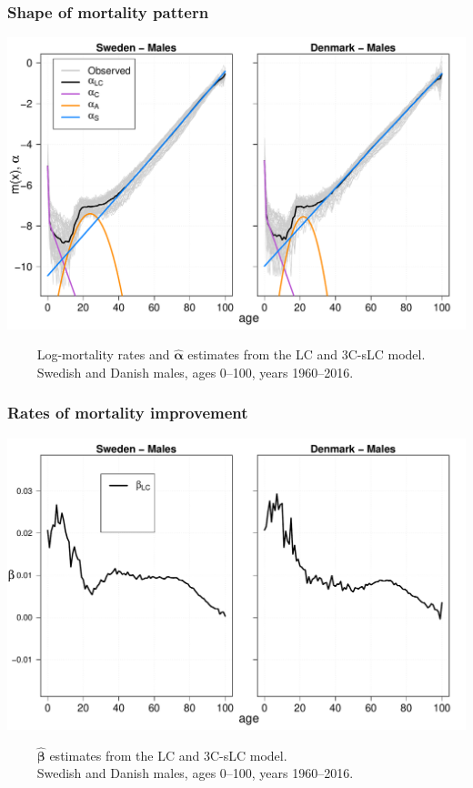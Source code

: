 \documentclass[12pt, xcolor=table]{beamer}  %
\begin{document}
\begin{frame}[noframenumbering]           
	\frametitle{Shape of mortality pattern}
	\begin{center}
		\includegraphics[scale=0.41]{Figures/Ch5/Alpha3}
	\end{center}

\vspace{-0.35cm}
\tiny{$\quad\quad$ Log-mortality rates and $\bm{\hat{\alpha}}$ estimates from the LC and 3C-sLC model. \\ $\quad\quad$ Swedish and Danish males, ages 0--100, years 1960--2016.}
	
\end{frame}

\begin{frame}          
	\frametitle{Rates of mortality improvement}
	\begin{center}
		\includegraphics[scale=0.41]{Figures/Ch5/Beta1}
	\end{center}
	
	\vspace{-0.35cm}
\tiny{$\quad\quad$ $\bm{\hat{\beta}}$ estimates from the LC and 3C-sLC model. \\ $\quad\quad$ Swedish and Danish males, ages 0--100, years 1960--2016.}
\end{frame}
\end{document}
